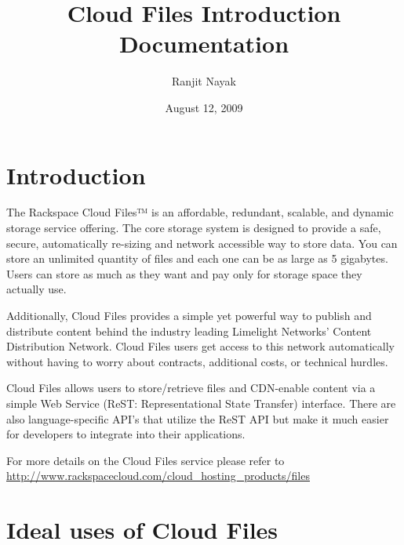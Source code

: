 \documentclass[letterpaper,10pt,english]{manual}
\title{Cloud Files Introduction Documentation}
\date{August 12, 2009}
\author{Ranjit Nayak}
\begin{document}
\maketitle
\tableofcontents




\chapter{Introduction}

The Rackspace Cloud Files™ is an affordable, redundant, scalable, and
dynamic storage service offering.  The core storage system is designed
to provide a safe, secure, automatically re-sizing and network accessible
way to store data.  You can store an unlimited quantity of files and each
one can be as large as 5 gigabytes. Users can store as much as they want
and pay only for storage space they actually use.

Additionally, Cloud Files provides a simple yet powerful way to publish
and distribute content behind the industry leading Limelight Networks'
Content Distribution Network. Cloud Files users get access to this network
automatically without having to worry about contracts, additional costs,
or technical hurdles.

Cloud Files allows users to store/retrieve files and CDN-enable content
via a simple Web Service (ReST: Representational State Transfer) interface.
There are also language-specific API’s that utilize the ReST API but make
it much easier for developers to integrate into their applications.

For more details on the Cloud Files service please refer to
\href{http://www.rackspacecloud.com/cloud\_hosting\_products/files}{http://www.rackspacecloud.com/cloud\_hosting\_products/files}


\chapter{Ideal uses of Cloud Files}
\end{document}
